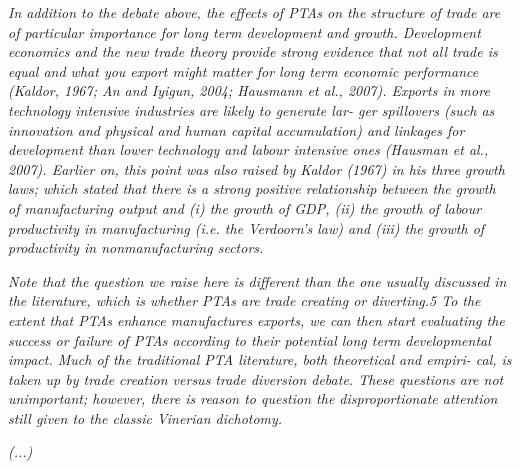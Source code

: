 \documentclass{article}%
\begin{document}
\emph{In addition to the debate above, the effects of PTAs on the
structure of trade are of particular importance for long term
development and growth. Development economics and the new trade theory
provide strong evidence that not all trade is equal and what you export
might matter for long term economic performance (Kaldor, 1967; An and
Iyigun, 2004; Hausmann et al., 2007). Exports in more technology
intensive industries are likely to generate lar- ger spillovers (such as
innovation and physical and human capital accumulation) and linkages for
development than lower technology and labour intensive ones (Hausman et
al., 2007). Earlier on, this point was also raised by Kaldor (1967) in
his three growth laws; which stated that there is a strong positive
relationship between the growth of manufacturing output and (i) the
growth of GDP, (ii) the growth of labour productivity in manufacturing
(i.e. the Verdoorn's law) and (iii) the growth of productivity in
nonmanufacturing sectors.}

\emph{Note that the question we raise here is different than the one
usually discussed in the literature, which is whether PTAs are trade
creating or diverting.5 To the extent that PTAs enhance manufactures
exports, we can then start evaluating the success or failure of PTAs
according to their potential long term developmental impact. Much of the
traditional PTA literature, both theoretical and empiri- cal, is taken
up by trade creation versus trade diversion debate. These questions are
not unimportant; however, there is reason to question the
disproportionate attention still given to the classic Vinerian
dichotomy.}

\emph{(...)}
\end{document}
